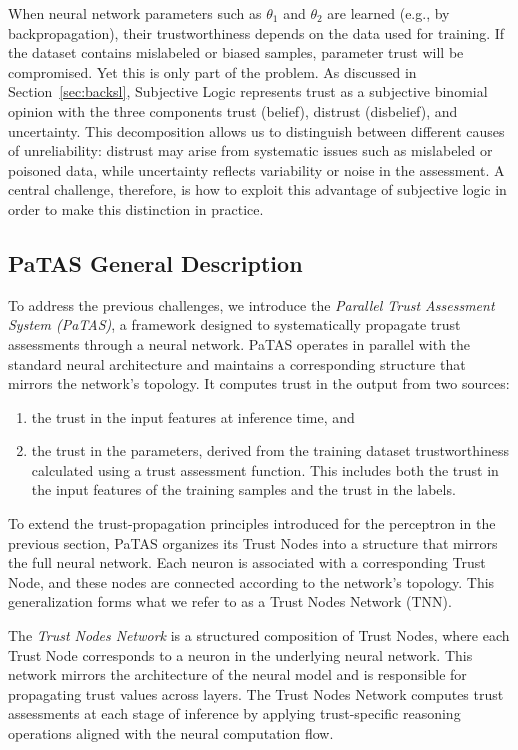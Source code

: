 When neural network parameters such as \( \theta_1 \) and \( \theta_2 \) are learned (e.g., by backpropagation), their trustworthiness depends on the data used for training. If the dataset contains mislabeled or biased samples, parameter trust will be compromised. Yet this is only part of the problem. As discussed in Section~\ref{sec:backsl}, Subjective Logic represents trust as a subjective binomial opinion with the three components trust (belief), distrust (disbelief), and uncertainty. This decomposition allows us to distinguish between different causes of unreliability: distrust may arise from systematic issues such as mislabeled or poisoned data, while uncertainty reflects variability or noise in the assessment. A central challenge, therefore, is how to exploit this advantage of subjective logic in order to make this distinction in practice.

\vspace{-0.5em}
\subsection{PaTAS General Description}

To address the previous challenges, we introduce the \emph{Parallel Trust Assessment System (PaTAS)}, a framework designed to systematically propagate trust assessments through a neural network. PaTAS operates in parallel with the standard neural architecture and maintains a corresponding structure that mirrors the network’s topology. It computes trust in the output from two sources:
\begin{enumerate}
    \item the trust in the input features at inference time, and
    \item the trust in the parameters, derived from the training dataset trustworthiness calculated using a trust assessment function. 
    This includes both the trust in the input features of the training samples and the trust in the labels.
\end{enumerate}
To extend the trust-propagation principles introduced for the perceptron in the previous section, PaTAS organizes its Trust Nodes into a structure that mirrors the full neural network. Each neuron is associated with a corresponding Trust Node, and these nodes are connected according to the network’s topology. This generalization forms what we refer to as a Trust Nodes Network (TNN).
\begin{definition}
The \emph{Trust Nodes Network} is a structured composition of Trust Nodes, where each Trust Node corresponds to a neuron in the underlying neural network. This network mirrors the architecture of the neural model and is responsible for propagating trust values across layers. The Trust Nodes Network computes trust assessments at each stage of inference by applying trust-specific reasoning operations aligned with the neural computation flow.
\end{definition}


